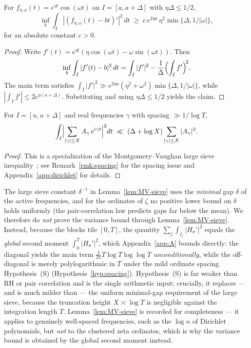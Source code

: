 \begin{lemma}\label{lem:derivative-penalty}
For $f_{\eta,\omega}(t)=e^{\eta t}\cos(\omega t)$ on $I=[a,a+\Delta]$
with $\eta\Delta\le 1/2$,
\[
\inf_b \int_I |(f_{\eta,\omega}(t)-bt)'|^2\,dt
\;\ge\; c\, e^{2\eta a}\,\eta^2\min\{\Delta,1/|\omega|\},
\]
for an absolute constant $c>0$.
\end{lemma}

\begin{proof}
Write $f'(t)=e^{\eta t}(\eta\cos(\omega t)-\omega\sin(\omega t))$. Then
\[
\inf_b \int_I |f'(t)-b|^2\,dt
= \int_I |f'|^2 - \frac{1}{\Delta}\Bigl(\int_I f'\Bigr)^{\!2}.
\]
The main term satisfies
$\int_I |f'|^2 \gg e^{2\eta a}(\eta^2+\omega^2)\min\{\Delta,1/|\omega|\}$,
while $|\int_I f'| \le 2e^{\eta(a+\Delta)}$.
Substituting and using $\eta\Delta\le 1/2$ yields the claim.
\end{proof}

\begin{lemma}\label{lem:MV-sieve}
For $I=[u,u+\Delta]$ and real frequencies $\gamma$ with spacing
$\gg 1/\log T$,
\[
\int_I \Bigl|\sum_{|\gamma|\le X} A_\gamma\, e^{i\gamma t}\Bigr|^2 dt
\;\ll\; (\Delta + \log X)\sum_{|\gamma|\le X} |A_\gamma|^2.
\]
\end{lemma}

\begin{proof}
This is a specialization of the Montgomery--Vaughan large sieve
inequality~\cite{montgomery-vaughan}; see Remark~\ref{rmk:spacing} for the
spacing issue and Appendix~\ref{app:dirichlet} for details.
\end{proof}

\begin{remark}\label{rmk:spacing}
The large sieve constant $\delta^{-1}$ in Lemma~\ref{lem:MV-sieve} uses the
\emph{minimal} gap $\delta$ of the active frequencies, and for the ordinates of
$\zeta$ no positive lower bound on $\delta$ holds uniformly (the
pair-correlation law predicts gaps far below the mean).  We therefore do
\emph{not} prove the variance bound through Lemma~\ref{lem:MV-sieve}.  Instead,
because the blocks tile $[0,T]$, the quantity
$\sum_j\int_{I_j}|H_\sigma'|^2$ equals the \emph{global} second moment
$\int_0^T|H_\sigma'|^2$, which Appendix~\ref{app:A} bounds directly: the diagonal
yields the main term $\tfrac{1}{2\pi}T\log T\log\log T$ \emph{unconditionally},
while the off-diagonal is merely polylogarithmic in $T$ under the mild ordinate
spacing Hypothesis~(S) (Hypothesis~\ref{hyp:spacing}).  Hypothesis~(S) is far
weaker than RH or pair correlation and is the single arithmetic input; crucially,
it replaces --- and is much milder than --- the uniform minimal-gap requirement
of the large sieve, because the truncation height $X\asymp\log T$ is negligible
against the integration length $T$.  Lemma~\ref{lem:MV-sieve} is recorded for
completeness --- it applies to genuinely well-spaced frequencies, such as the
$\log n$ of Dirichlet polynomials, but \emph{not} to the clustered zeta
ordinates, which is why the variance bound is obtained by the global second
moment instead.
\end{remark}

